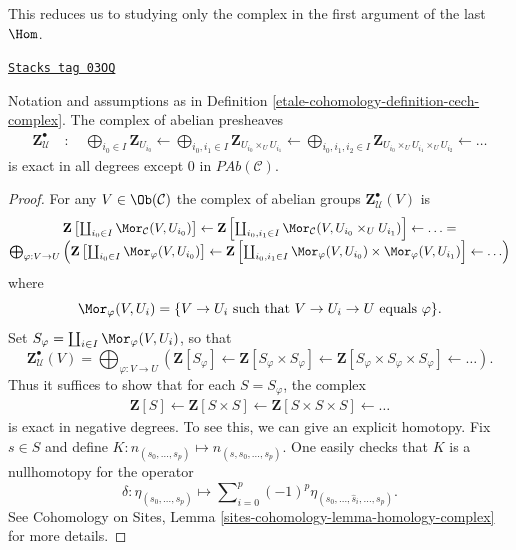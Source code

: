 This reduces us to studying only the complex in the first argument of the
last $\Hom$.

\begin{lemma}[Exact]
\label{etale-cohomology-lemma-exact}
\href{https://stacks.math.columbia.edu/tag/03OQ}{\texttt{Stacks tag 03OQ}}

Notation and assumptions as in Definition \ref{etale-cohomology-definition-cech-complex}.
The complex of abelian presheaves
\begin{align*}
\mathbf{Z}_\mathcal{U}^\bullet \quad : \quad
\bigoplus_{i_0 \in I} \mathbf{Z}_{U_{i_0}} \leftarrow
\bigoplus_{i_0, i_1 \in I} \mathbf{Z}_{U_{i_0} \times_U U_{i_1}} \leftarrow
\bigoplus_{i_0, i_1, i_2 \in I}
\mathbf{Z}_{U_{i_0} \times_U U_{i_1} \times_U U_{i_2}} \leftarrow
\ldots
\end{align*}
is exact in all degrees except $0$ in $\textit{PAb}(\mathcal{C})$.
\end{lemma}

\begin{proof}
For any $V\in \Ob(\mathcal{C})$ the complex of abelian groups
$\mathbf{Z}_\mathcal{U}^\bullet(V)$ is
$$
\begin{matrix}
\mathbf{Z}\left[
\coprod_{i_0\in I} \Mor_\mathcal{C}(V, U_{i_0})\right]
\leftarrow
\mathbf{Z}\left[
\coprod_{i_0, i_1 \in I}
\Mor_\mathcal{C}(V, U_{i_0} \times_U U_{i_1})\right]
\leftarrow \ldots = \\
\bigoplus_{\varphi : V \to U}
\left(
\mathbf{Z}\left[\coprod_{i_0 \in I} \Mor_\varphi(V, U_{i_0})\right]
\leftarrow
\mathbf{Z}\left[\coprod_{i_0, i_1\in I} \Mor_\varphi(V, U_{i_0}) \times
\Mor_\varphi(V, U_{i_1})\right]
\leftarrow
\ldots
\right)
\end{matrix}
$$
where
$$
\Mor_{\varphi}(V, U_i)
=
\{ V \to U_i \text{ such that } V \to U_i \to U \text{ equals } \varphi \}.
$$
Set $S_\varphi = \coprod_{i\in I} \Mor_\varphi(V, U_i)$, so that
$$
\mathbf{Z}_\mathcal{U}^\bullet(V)
=
\bigoplus_{\varphi : V \to U}
\left(
\mathbf{Z}[S_\varphi] \leftarrow
\mathbf{Z}[S_\varphi \times S_\varphi] \leftarrow
\mathbf{Z}[S_\varphi \times S_\varphi \times S_\varphi] \leftarrow
\ldots \right).
$$
Thus it suffices to show that for each $S = S_\varphi$, the complex
\begin{align*}
\mathbf{Z}[S] \leftarrow
\mathbf{Z}[S \times S] \leftarrow
\mathbf{Z}[S \times S \times S] \leftarrow \ldots
\end{align*}
is exact in negative degrees. To see this, we can give an explicit homotopy.
Fix $s\in S$ and define $K: n_{(s_0, \ldots, s_p)} \mapsto n_{(s, s_0,
\ldots, s_p)}.$ One easily checks that $K$ is a nullhomotopy for the operator
$$
\delta :
\eta_{(s_0, \ldots, s_p)}
\mapsto
\sum\nolimits_{i = 0}^p (-1)^p \eta_{(s_0, \ldots, \hat s_i, \ldots, s_p)}.
$$
See
Cohomology on Sites, Lemma \ref{sites-cohomology-lemma-homology-complex}
for more details.
\end{proof}

